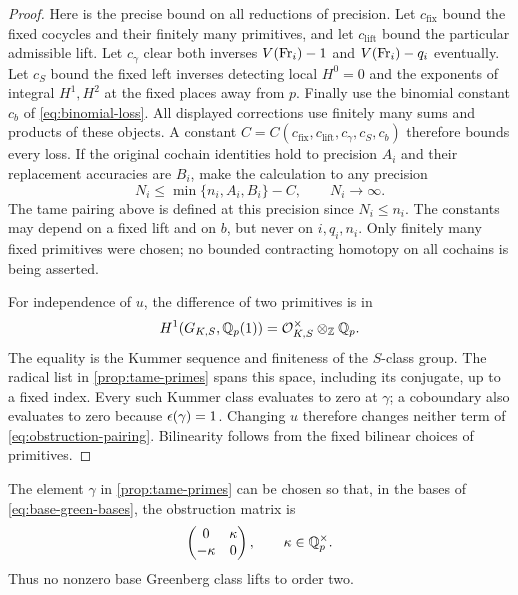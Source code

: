 \begin{proof}
Here is the precise bound on all reductions of precision.  Let
$c_{\mathrm{fix}}$ bound the fixed cocycles and their finitely many
primitives, and let $c_{\mathrm{lift}}$ bound the particular
admissible lift.  Let $c_\gamma$ clear both inverses
$V(\operatorname{Fr}_i)-1$ and $V(\operatorname{Fr}_i)-q_i$ eventually.  Let $c_S$ bound
the fixed left inverses detecting local $H^0=0$ and the exponents
of integral $H^1,H^2$ at the fixed places away from $p$.  Finally
use the binomial constant $c_b$ of \cref{eq:binomial-loss}.
All displayed corrections use finitely many sums and products of
these objects.  A constant
$C=C(c_{\mathrm{fix}},c_{\mathrm{lift}},c_\gamma,c_S,c_b)$ therefore
bounds every loss.  If the original cochain identities hold to
precision $A_i$ and their replacement accuracies are $B_i$, make
the calculation to any precision
\begin{equation}\label{eq:precision-choice}
 N_i\le\min\{n_i,A_i,B_i\}-C,\qquad N_i\longrightarrow\infty.
\end{equation}
The tame pairing above is defined at this precision since
$N_i\le n_i$.  The constants may depend on a fixed lift and on
$b$, but never on $i,q_i,n_i$.  Only finitely many fixed primitives
were chosen; no bounded contracting homotopy on all cochains is
being asserted.

For independence of $u$, the difference of two primitives is in
\[
 H^1(G_{K,S},\mathbb Q_p(1))
   =\mathcal O_{K,S}^{\times}\otimes_{\mathbb Z}\mathbb Q_p.
\]
The equality is the Kummer sequence and finiteness of the
$S$-class group.  The radical list in \cref{prop:tame-primes}
spans this space, including its conjugate, up to a fixed index.
Every such Kummer class evaluates to zero at $\gamma$; a
coboundary also evaluates to zero because $\epsilon(\gamma)=1$.
Changing $u$ therefore changes neither term of
\cref{eq:obstruction-pairing}.  Bilinearity follows from the fixed
bilinear choices of primitives.
\end{proof}

\begin{lemma}\label{lem:nonzero-obstruction}
The element $\gamma$ in \cref{prop:tame-primes} can be chosen so
that, in the bases of \cref{eq:base-green-bases}, the obstruction
matrix is
\begin{equation}\label{eq:obstruction-matrix}
 \begin{pmatrix}0&\kappa\\-\kappa&0\end{pmatrix},
 \qquad \kappa\in\mathbb Q_p^\times.
\end{equation}
Thus no nonzero base Greenberg class lifts to order two.
\end{lemma}


